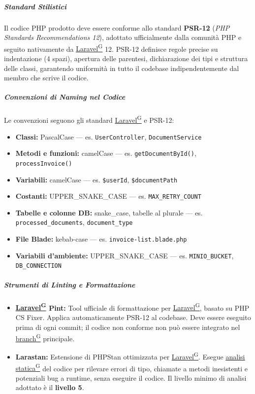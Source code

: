 \documentclass[a4paper,12pt]{article}
\providecommand{\glslink}[2]{\href{https://alittlebyte-19.github.io/Documentazione/glossario.html\#gls-#1}{\underline{#2}\textsuperscript{\scriptsize G}}}
\begin{document}
\subparagraph{Standard Stilistici}
Il codice PHP prodotto deve essere conforme allo standard \textbf{PSR-12} (\textit{PHP Standards Recommendations 12}), adottato ufficialmente dalla comunità PHP e seguito nativamente da \glslink{laravel}{Laravel} 12. PSR-12 definisce regole precise su indentazione (4 spazi), apertura delle parentesi, dichiarazione dei tipi e struttura delle classi, garantendo uniformità in tutto il codebase indipendentemente dal membro che scrive il codice.

\subparagraph{Convenzioni di Naming nel Codice}
Le convenzioni seguono gli standard \glslink{laravel}{Laravel} e PSR-12:
\begin{itemize}
    \item \textbf{Classi:} PascalCase — es. \texttt{UserController}, \texttt{DocumentService}
    \item \textbf{Metodi e funzioni:} camelCase — es. \texttt{getDocumentById()}, \texttt{processInvoice()}
    \item \textbf{Variabili:} camelCase — es. \texttt{\$userId}, \texttt{\$documentPath}
    \item \textbf{Costanti:} UPPER\_SNAKE\_CASE — es. \texttt{MAX\_RETRY\_COUNT}
    \item \textbf{Tabelle e colonne DB:} snake\_case, tabelle al plurale — es. \texttt{processed\_documents}, \texttt{document\_type}
    \item \textbf{File Blade:} kebab-case — es. \texttt{invoice-list.blade.php}
    \item \textbf{Variabili d'ambiente:} UPPER\_SNAKE\_CASE — es. \texttt{MINIO\_BUCKET}, \texttt{DB\_CONNECTION}
\end{itemize}

\subparagraph{Strumenti di Linting e Formattazione}
\begin{itemize}
    \item \textbf{\glslink{laravel}{Laravel} Pint:} Tool ufficiale di formattazione per \glslink{laravel}{Laravel}, basato su PHP CS Fixer. Applica automaticamente PSR-12 al codebase. Deve essere eseguito prima di ogni commit; il codice non conforme non può essere integrato nel \glslink{branch}{branch} principale.
    \item \textbf{Larastan:} Estensione di PHPStan ottimizzata per \glslink{laravel}{Laravel}. Esegue \glslink{analisi-statica}{analisi statica} del codice per rilevare errori di tipo, chiamate a metodi inesistenti e potenziali bug a runtime, senza eseguire il codice. Il livello minimo di analisi adottato è il \textbf{livello 5}.
\end{itemize}
\end{document}
